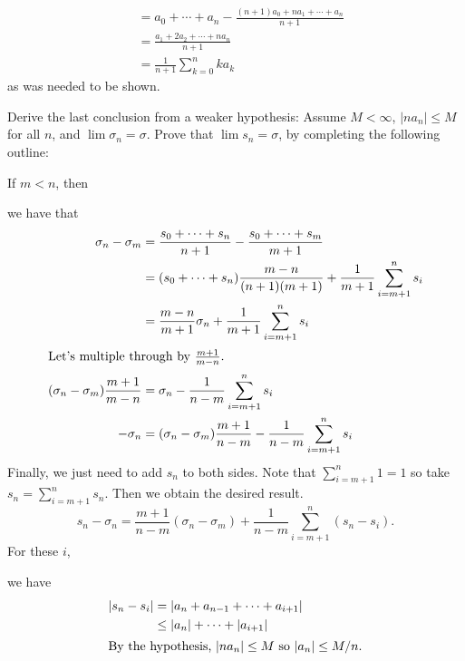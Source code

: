 \begin{exercise}
\begin{exercise}[label = (\alph*), ref = \arabic{exercisei} (\alph*)]
\begin{align*}
                     & = a_0 + \cdots + a_n -
                       \frac{(n + 1)a_0 + na_1 + \cdots + a_n}{n + 1}\\
                     & = \frac{a_1 + 2a_2 + \cdots + na_n}{n + 1}\\
                     & = \frac{1}{n + 1}\sum_{k = 0}^nka_k
    \end{align*}
    as was needed to be shown.
  \item
    Derive the last conclusion from a weaker hypothesis: Assume \(M < \infty\),
    \(\lvert na_n\rvert\leq M\) for all \(n\), and \(\lim\sigma_n = \sigma\).
    Prove that \(\lim s_n = \sigma\), by completing the following outline:
    \par\smallskip
    If \(m < n\), then
    \par\smallskip
    {\color{NavyBlue}
      we have that
      \begin{align*}
        \sigma_n - \sigma_m
        & = \frac{s_0 + \cdots + s_n}{n + 1} -
          \frac{s_0 + \cdots + s_m}{m + 1}\\
        & = (s_0 + \cdots + s_n)\frac{m - n}{(n + 1)(m + 1)} +
          \frac{1}{m + 1}\sum_{i = m + 1}^ns_i\\
        & = \frac{m - n}{m + 1}\sigma_n + \frac{1}{m + 1}
          \sum_{i = m + 1}^ns_i\\
        \intertext{Let's multiple through by \(\frac{m + 1}{m - n}\).}
        (\sigma_n - \sigma_m)\frac{m + 1}{m - n}
        & = \sigma_n - \frac{1}{n - m}\sum_{i = m + 1}^ns_i\\
        -\sigma_n & = (\sigma_n - \sigma_m)\frac{m + 1}{n - m} -
                    \frac{1}{n - m}\sum_{i = m + 1}^ns_i
      \end{align*}
      Finally, we just need to add \(s_n\) to both sides.
      Note that \(\sum_{i = m + 1}^n1 = 1\) so take
      \(s_n = \sum_{i = m + 1}^ns_n\).
      Then we obtain the desired result.
    }
    \[
    s_n - \sigma_n = \frac{m + 1}{n - m}(\sigma_n - \sigma_m) +
    \frac{1}{n - m}\sum_{i = m + 1}^n(s_n - s_i).
    \]
    For these \(i\),
    \par\smallskip
    {\color{NavyBlue}
      we have
      \begin{align*}
        \lvert s_n - s_i\rvert
        & = \lvert a_n + a_{n - 1} + \cdots + a_{i + 1}\rvert\\
        & \leq \lvert a_n\rvert + \cdots + \lvert a_{i + 1}\rvert\\
        \intertext{By the hypothesis, \(\lvert na_n\rvert\leq M\) so
        \(\lvert a_n\rvert\leq M/n\).}

\end{align*}}
\end{exercise}
\end{exercise}
